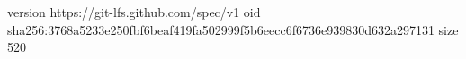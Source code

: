 version https://git-lfs.github.com/spec/v1
oid sha256:3768a5233e250fbf6beaf419fa502999f5b6eecc6f6736e939830d632a297131
size 520
